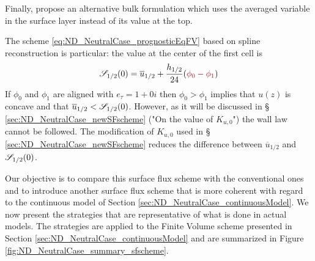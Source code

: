 Finally, \cite{nishizawa_surface_2018} propose an alternative
bulk formulation which uses the averaged variable in the surface layer
instead of its value at the top.
\begin{remark}
The scheme \eqref{eq:ND_NeutralCase_prognosticEqFV} based
on spline reconstruction is particular:
	the value at the center of the first cell is
		\begin{equation}
			{\cal S}_{1/2}(0) = \overline{u}_{1/2}
			+ \frac{h_{1/2}}{24} (\emphase{\phi_0-\phi_1})
		\end{equation}
 If $\phi_0$ and $\phi_1$ are aligned with $e_\tau=1+0i$ then
	$\phi_0 > \phi_1$ implies that $u(z)$ is concave and
	that $\overline{u}_{1/2} < {\cal S}_{1/2}(0)$.
	However, as it will be discussed in \S
	\ref{sec:ND_NeutralCase_newSFscheme}
	("On the value of $K_{u,0}$")
	the wall law cannot be followed.
	The modification of $K_{u,0}$ used in \S
	\ref{sec:ND_NeutralCase_newSFscheme} reduces
	the difference between $\overline{u}_{1/2}$
	and ${\cal S}_{1/2}(0)$.
\end{remark}
%
Our objective is to compare this surface flux scheme with the
conventional ones
and to introduce another surface flux scheme that is more coherent
with regard to the continuous model of Section
\ref{sec:ND_NeutralCase_continuousModel}.
We now present the strategies that are representative of
what is done in actual models. The strategies are applied to
the Finite Volume scheme presented in Section
\ref{sec:ND_NeutralCase_continuousModel} and are
summarized in Figure \ref{fig:ND_NeutralCase_summary_sfscheme}.
